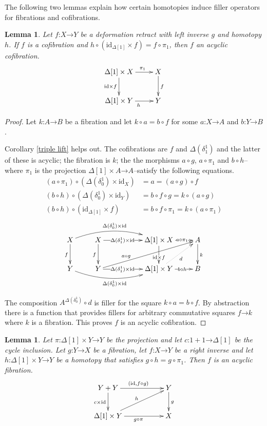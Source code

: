 \documentclass{amsart}
\theoremstyle{plain}
\newtheorem{lemma}[theorem]{Lemma}
\theoremstyle{definition}
\newcommand\id{\mathrm{id}}
\newcommand\of{\mathord:}
\renewcommand\to{\mathord\rightarrow}
\newcommand\simplex\Delta
\begin{document}
The following two lemmas explain how certain homotopies induce filler operators for fibrations and cofibrations. 

\begin{lemma} Let $f\of X\to Y$ be a deformation retract with left inverse $g$ and homotopy $h$. If $f$ is a cofibration and $h\circ(\id_{\simplex[1]}\times f) = f\circ \pi_1$, then $f$ an acyclic cofibration.  \label{retract is acyclic}
\[\xymatrix{
\simplex[1]\times X \ar[r]^(.6){\pi_1}\ar[d]_{\id\times f} & X\ar[d]^f\\
\simplex[1]\times Y \ar[r]_h & Y
}\]
\end{lemma}

\begin{proof} 
Let $k\of A\to B$ be a fibration and let $k\circ a = b\circ f$ for some $a\of X\to A$ and $b\of Y\to B$. 

Corollary \ref{triple lift} helps out. The cofibrations are $f$ and $\simplex(\delta^1_1)$ and the latter of these is acyclic; the fibration is $k$; the the morphisms $a\circ g$, $a\circ \pi_1$ and $b\circ h$--where $\pi_1$ is the projection $\simplex[1]\times A\to A$--satisfy the following equations.
\begin{align*} 
	(a\circ \pi_1)\circ (\simplex(\delta^1_0)\times\id_X) &= a = (a\circ g)\circ f\\
	(b\circ h)\circ (\simplex(\delta^1_0)\times\id_Y) &= b\circ f\circ g = k\circ (a\circ g)\\
	(b\circ h)\circ (\id_{\simplex[1]}\times f) &= b\circ f\circ \pi_1 = k\circ (a\circ \pi_1)
\end{align*}
\[\xymatrix{
X\ar[d]_f\ar@/^3ex/[rrr]^{\simplex(\delta^1_0)\times\id} &X\ar[d]_f \ar[rr]|(.4){\simplex(\delta^1_1)\times \id} && \simplex[1]\times X \ar[d]|(.6){\id\times f}\ar[r]|(.6){a\circ \pi_1} & A\ar[d]^k\\
Y\ar@/_3ex/[rrr]_{\simplex(\delta^1_0)\times\id}&Y \ar[rr]|(.4){\simplex(\delta^1_1)\times \id}\ar[urrr]^(.3){a\circ g} && \simplex[1]\times Y\ar[r]|(.6){b\circ h}\ar@{.>}[ur]_d & B
}\] 

The composition $A^{\simplex(\delta^1_0)}\circ d$ is filler for the square $k\circ a = b\circ f$. By abstraction there is a function that provides fillers for arbitrary commutative squares $f\to k$ where $k$ is a fibration. This proves $f$ is an acyclic cofibration.
\end{proof}

\begin{lemma} Let $\pi\of \simplex[1]\times Y\to Y$ be the projection and let $c\of 1+1\to\simplex[1]$ be the cycle inclusion. Let $g\of Y\to X$ be a fibration, let $f\of X\to Y$ be a right inverse and let $h\of \simplex[1]\times Y \to Y$ be a homotopy that satisfies $g\circ h = g\circ \pi_1$. Then $f$ is an acyclic fibration. \label{deformation is acyclic}
\[\xymatrix{
Y+Y\ar[rr]^{(\id,f\circ g)}\ar[d]_{c\times \id} && Y\ar[d]^g \\
\simplex[1]\times Y \ar[rr]_{g\circ\pi}\ar[urr]^h && X
}\]
\end{lemma}
\end{document}
